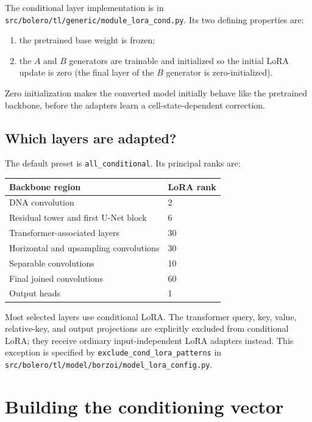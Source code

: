 \documentclass[11pt]{article}
\newcommand{\code}[1]{\texttt{\small #1}}
\begin{document}
The conditional layer implementation is in
\code{src/bolero/tl/generic/module\_lora\_cond.py}. Its two defining properties are:

\begin{enumerate}[leftmargin=2em]
  \item the pretrained base weight is frozen;
  \item the $A$ and $B$ generators are trainable and initialized so the initial LoRA
        update is zero (the final layer of the $B$ generator is zero-initialized).
\end{enumerate}

Zero initialization makes the converted model initially behave like the pretrained
backbone, before the adapters learn a cell-state-dependent correction.

\subsection{Which layers are adapted?}

The default preset is \code{all\_conditional}. Its principal ranks are:

\begin{center}
\begin{tabular}{ll}
\toprule
Backbone region & LoRA rank \\
\midrule
DNA convolution & 2 \\
Residual tower and first U-Net block & 6 \\
Transformer-associated layers & 30 \\
Horizontal and upsampling convolutions & 30 \\
Separable convolutions & 10 \\
Final joined convolutions & 60 \\
Output heads & 1 \\
\bottomrule
\end{tabular}
\end{center}

Most selected layers use conditional LoRA. The transformer query, key, value, relative-key,
and output projections are explicitly excluded from conditional LoRA; they receive ordinary
input-independent LoRA adapters instead. This exception is specified by
\code{exclude\_cond\_lora\_patterns} in
\code{src/bolero/tl/model/borzoi/model\_lora\_config.py}.

\section{Building the conditioning vector}
\end{document}
